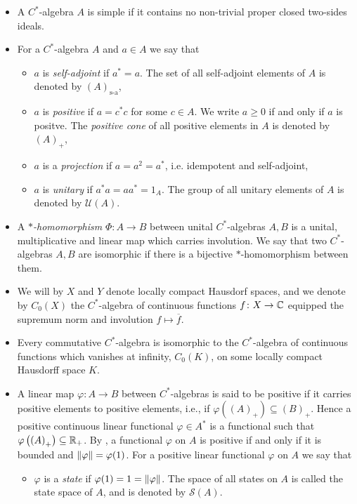 \begin{itemize}
\item A $C^*$-algebra $A$ is simple if it contains no non-trivial proper closed two-sides ideals.
\item For a $C^*$-algebra $A$ and $a \in A$ we say that
\begin{itemize}
\item $a$ is \emph{self-adjoint} if $a^*=a$. The set of all self-adjoint elements of $A$ is denoted by $(A)_{\text{s-a}}$,
\item $a$ is \emph{positive} if $a=c^*c$ for some $c \in A$. We write $a \geq 0$ if and only if $a$ is positve. The \emph{positive cone} of all positive elements in $A$ is denoted by $(A)_{+}$,
\item $a$ is a \emph{projection} if $a=a^2=a^*$, i.e. idempotent and self-adjoint,
\item $a$ is \emph{unitary} if $a^*a=aa^*=1_{A}$. The group of all unitary elements of $A$ is denoted by $\mathcal{U}(A)$.
\end{itemize}
\item A \emph{$*$-homomorphism} $\Phi \colon A \to B$ between unital $C^*$-algebras $A , B$ is a unital, multiplicative and linear map which carries involution. We say that two $C^*$-algebras $A,B$ are isomorphic if there is a bijective $*$-homomorphism between them.
\item We will by $X$ and $Y$ denote locally compact Hausdorf spaces, and we denote by $C_0(X)$ the $C^*$-algebra of continuous functions $f \colon X \to \mathbb{C}$ equipped the supremum norm and involution $f \mapsto \overline{f}$.
\item Every commutative $C^*$-algebra is isomorphic to the $C^*$-algebra of continuous functions which vanishes at infinity, $C_0(K)$, on some locally compact Hausdorff space $K$.  
\item A linear map $\varphi \colon A \to B$ between $C^*$-algebras is said to be positive if it carries positive elements to positive elements, i.e., if $\varphi\left( (A)_{+} \right) \subseteq \left(B\right)_+$. Hence a positive continuous linear functional $\varphi \in A^*$ is a functional such that $\varphi\left( \left( A \right)_+\right) \subseteq \mathbb{R}_+$. By \cite[Theorem 13.5][79]{zhu}, a functional $\varphi$ on $A$ is positive if and only if it is bounded and $\left\lVert \varphi \right\rVert = \varphi(1)$. For a positive linear functional $\varphi$ on $A$ we say that
\begin{itemize}
\item $\varphi$ is a \emph{state} if $\varphi(1)=1=\left\lVert \varphi \right\rVert$. The space of all states on $A$ is called the state space of $A$, and is denoted by $\mathcal{S}(A)$.

\end{itemize}
\end{itemize}
